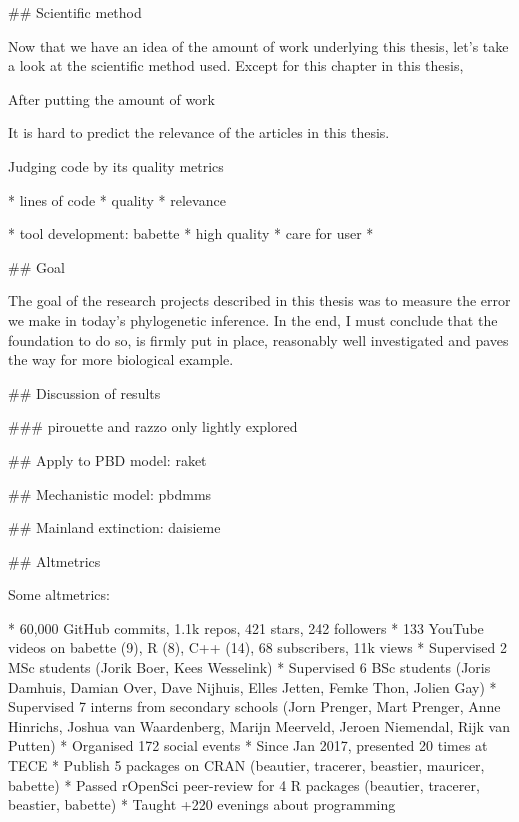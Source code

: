 ## Scientific method

Now that we have an idea of the amount of work underlying
this thesis, let's take a look at the scientific method used.
Except for this chapter in this thesis,


After putting the amount of work 

It is hard to predict the relevance of the articles in this thesis.











Judging code by its quality
metrics 

 * lines of code
 * quality
 * relevance



 * tool development: babette
 * high quality
 * care for user
 * 




## Goal 

The goal of the research projects
described in this thesis
was to measure the error we make in today's phylogenetic inference.
In the end, I must conclude that the foundation to do so, is firmly 
put in place, reasonably well investigated and paves the way for
more biological example.

## Discussion of results

### pirouette and razzo only lightly explored


## Apply to PBD model: raket

## Mechanistic model: pbdmms

## Mainland extinction: daisieme

## Altmetrics

Some altmetrics:

 * 60,000 GitHub commits, 1.1k repos, 421 stars, 242 followers
 * 133 YouTube videos on babette (9), R (8), C++ (14), 68 subscribers, 11k views
 * Supervised 2 MSc students (Jorik Boer, Kees Wesselink)
 * Supervised 6 BSc students (Joris Damhuis, 
   Damian Over, Dave Nijhuis, Elles Jetten, Femke Thon, Jolien Gay)
 * Supervised 7 interns from secondary schools (Jorn Prenger, Mart Prenger, 
   Anne Hinrichs, Joshua van Waardenberg, Marijn Meerveld, Jeroen Niemendal, 
   Rijk van Putten)
 * Organised 172 social events
 * Since Jan 2017, presented 20 times at TECE
 * Publish 5 packages on CRAN (beautier, tracerer, beastier, mauricer, babette)
 * Passed rOpenSci peer-review for 4 R packages (beautier, tracerer, beastier, babette)
 * Taught +220 evenings about programming

